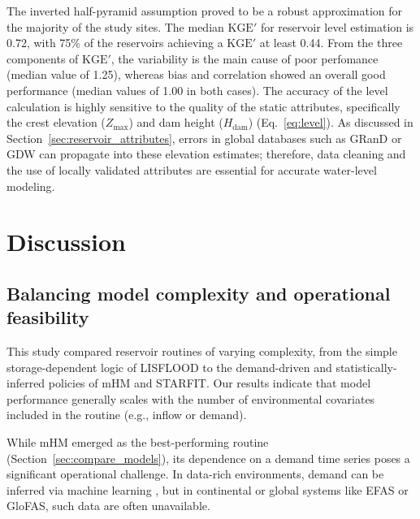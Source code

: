 \documentclass[hess, manuscript]{copernicus}
\newcommand{\KGEmod}{$\text{KGE}'$} %
\providecommand{\DIFadd}[1]{{\protect\color{blue}\uwave{#1}}} %
\providecommand{\DIFdel}[1]{{\protect\color{red}\sout{#1}}}                      %
\providecommand{\DIFaddbegin}{} %
\providecommand{\DIFaddend}{} %
\providecommand{\DIFdelbegin}{} %
\providecommand{\DIFdelend}{} %
\begin{document}
The inverted half-pyramid assumption proved to be a robust approximation for the majority of the study sites. The median \DIFdelbegin \DIFdel{$\text{KGE}'$ }\DIFdelend \DIFaddbegin \DIFadd{\KGEmod\ }\DIFaddend for reservoir level estimation is 0.72, with 75\% of the reservoirs achieving a \DIFdelbegin \DIFdel{$\text{KGE}'$ }\DIFdelend \DIFaddbegin \DIFadd{\KGEmod\ }\DIFaddend at least 0.44. From the three components of \DIFdelbegin \DIFdel{$\text{KGE}'$}\DIFdelend \DIFaddbegin \DIFadd{\KGEmod}\DIFaddend , the variability is the main cause of poor perfomance (median value of 1.25), whereas bias and correlation showed an overall good performance (median values of 1.00 in both cases). The accuracy of the level calculation is highly sensitive to the quality of the static attributes, specifically the crest elevation ($Z_{\max}$) and dam height ($H_{\text{dam}}$) (Eq.~\ref{eq:level}). As discussed in Section~\ref{sec:reservoir_attributes}, errors in global databases such as GRanD or GDW can propagate into these elevation estimates; therefore, data cleaning and the use of locally validated attributes are essential for accurate water-level modeling.



\section{Discussion}
\label{sec:discussion}

\subsection{Balancing model complexity and operational feasibility}
\label{sec:comparison_reservoirs}

This study compared reservoir routines of varying complexity, from the simple storage-dependent logic of LISFLOOD to the demand-driven and statistically-inferred policies of mHM and STARFIT. Our results indicate that model performance generally scales with the number of environmental covariates included in the routine (e.g., inflow or demand).

While mHM emerged as the best-performing routine (Section~\ref{sec:compare_models}), its dependence on a demand time series poses a significant operational challenge. In data-rich environments, demand can be inferred via machine learning \citep{Shrestha2024}, but in continental or global systems like EFAS or GloFAS, such data are often unavailable. 
\end{document}
